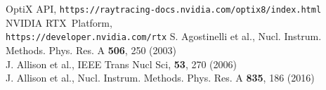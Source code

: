 \documentclass{webofc}
\begin{document}
\begin{thebibliography}{}
\hspace*{0.0em}OptiX API, \texttt{https://raytracing-docs.nvidia.com/optix8/index.html}
NVIDIA RTX\texttrademark\, Platform,\\ \texttt{https://developer.nvidia.com/rtx}
S. Agostinelli et al., Nucl. Instrum. Methods. Phys. Res. A {\bf 506}, 250 (2003)\\
\hspace*{0.0em}J. Allison et al., IEEE Trans Nucl Sci, {\bf 53}, 270 (2006)\\
\hspace*{0.0em}J. Allison et al., Nucl. Instrum. Methods. Phys. Res. A {\bf 835}, 186 (2016)
%
%


\end{thebibliography}
\end{document}
